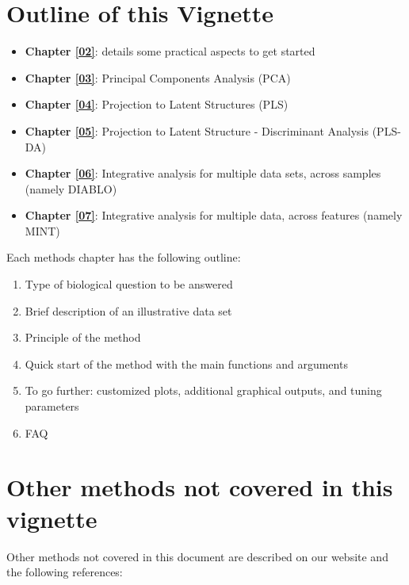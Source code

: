 \documentclass[
]{book}
\providecommand{\tightlist}{%
  \setlength{\itemsep}{0pt}\setlength{\parskip}{0pt}}
\begin{document}
\hypertarget{01:outline}{%
\section{Outline of this Vignette}\label{01:outline}}

\begin{itemize}
\tightlist
\item
  \textbf{Chapter \ref{02}}: details some practical aspects to get started
\item
  \textbf{Chapter \ref{03}}: Principal Components Analysis (PCA)
\item
  \textbf{Chapter \ref{04}}: Projection to Latent Structures (PLS)
\item
  \textbf{Chapter \ref{05}}: Projection to Latent Structure - Discriminant Analysis (PLS-DA)
\item
  \textbf{Chapter \ref{06}}: Integrative analysis for multiple data sets, across samples (namely DIABLO)
\item
  \textbf{Chapter \ref{07}}: Integrative analysis for multiple data, across features (namely MINT)
\end{itemize}

Each methods chapter has the following outline:

\begin{enumerate}
\def\labelenumi{\arabic{enumi}.}
\tightlist
\item
  Type of biological question to be answered
\item
  Brief description of an illustrative data set
\item
  Principle of the method
\item
  Quick start of the method with the main functions and arguments
\item
  To go further: customized plots, additional graphical outputs, and tuning parameters
\item
  FAQ
\end{enumerate}

\hypertarget{other-methods-not-covered-in-this-vignette}{%
\section{Other methods not covered in this vignette}\label{other-methods-not-covered-in-this-vignette}}

Other methods not covered in this document are described on our website and the following references:
\end{document}
